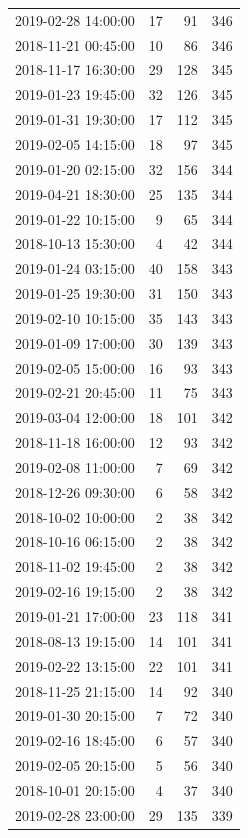 \begin{tabular}{lrrr}
2019-02-28 14:00:00 & 17 & 91 & 346 \\
2018-11-21 00:45:00 & 10 & 86 & 346 \\
2018-11-17 16:30:00 & 29 & 128 & 345 \\
2019-01-23 19:45:00 & 32 & 126 & 345 \\
2019-01-31 19:30:00 & 17 & 112 & 345 \\
2019-02-05 14:15:00 & 18 & 97 & 345 \\
2019-01-20 02:15:00 & 32 & 156 & 344 \\
2019-04-21 18:30:00 & 25 & 135 & 344 \\
2019-01-22 10:15:00 & 9 & 65 & 344 \\
2018-10-13 15:30:00 & 4 & 42 & 344 \\
2019-01-24 03:15:00 & 40 & 158 & 343 \\
2019-01-25 19:30:00 & 31 & 150 & 343 \\
2019-02-10 10:15:00 & 35 & 143 & 343 \\
2019-01-09 17:00:00 & 30 & 139 & 343 \\
2019-02-05 15:00:00 & 16 & 93 & 343 \\
2019-02-21 20:45:00 & 11 & 75 & 343 \\
2019-03-04 12:00:00 & 18 & 101 & 342 \\
2018-11-18 16:00:00 & 12 & 93 & 342 \\
2019-02-08 11:00:00 & 7 & 69 & 342 \\
2018-12-26 09:30:00 & 6 & 58 & 342 \\
2018-10-02 10:00:00 & 2 & 38 & 342 \\
2018-10-16 06:15:00 & 2 & 38 & 342 \\
2018-11-02 19:45:00 & 2 & 38 & 342 \\
2019-02-16 19:15:00 & 2 & 38 & 342 \\
2019-01-21 17:00:00 & 23 & 118 & 341 \\
2018-08-13 19:15:00 & 14 & 101 & 341 \\
2019-02-22 13:15:00 & 22 & 101 & 341 \\
2018-11-25 21:15:00 & 14 & 92 & 340 \\
2019-01-30 20:15:00 & 7 & 72 & 340 \\
2019-02-16 18:45:00 & 6 & 57 & 340 \\
2019-02-05 20:15:00 & 5 & 56 & 340 \\
2018-10-01 20:15:00 & 4 & 37 & 340 \\
2019-02-28 23:00:00 & 29 & 135 & 339 \\

\end{tabular}
